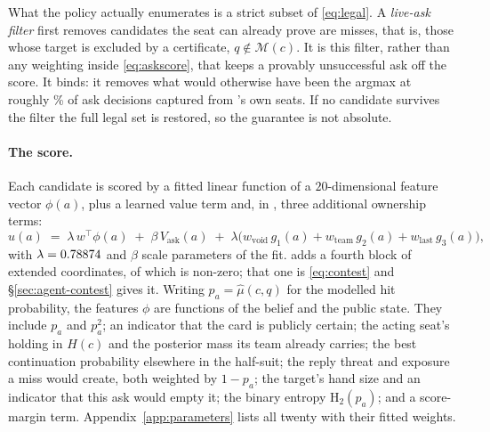 What the policy actually enumerates is a strict subset of \eqref{eq:legal}. A \emph{live-ask filter} first removes candidates the seat can already prove are misses, that is,
those whose target is excluded by a certificate, $q \notin \mathcal{M}(c)$. It is this filter, rather
than any weighting inside \eqref{eq:askscore}, that keeps a provably unsuccessful ask off the score. It
binds: it removes what would otherwise have been the argmax at roughly \vsevenGateBindRate\% of
\vsevenGateBindN{} ask decisions captured from \sestina{}'s own seats. If no candidate survives the filter the full legal set is
restored, so the guarantee is not absolute.

\paragraph{The score.} Each candidate is scored by a fitted linear function of a
$20$-dimensional feature vector $\phi(a)$, plus a learned value term and, in \sestina{}, three
additional ownership terms:
\begin{equation}
  u(a) \;=\; \lambda\, w^{\!\top}\phi(a) \;+\; \beta\, V_{\mathrm{ask}}(a)
  \;+\; \lambda\bigl(w_{\mathrm{void}}\, g_1(a) + w_{\mathrm{team}}\, g_2(a)
  + w_{\mathrm{last}}\, g_3(a)\bigr),
  \label{eq:askscore}
\end{equation}
with $\lambda = 0.78874{}$ and $\beta$ scale parameters of the fit. \sestina{} adds a
fourth block of \vsevenResponderTotal{} extended coordinates, of which
\vsevenResponderNonzero{} is non-zero; that one is \eqref{eq:contest} and
\S\ref{sec:agent-contest} gives it. Writing $p_a = \hat\mu(c,q)$ for the modelled
hit probability, the features $\phi$ are functions of the belief and the public state. They include $p_a$ and $p_a^2$; an indicator that the card is publicly
certain; the acting seat's holding in $H(c)$ and the posterior mass its team already carries; the
best continuation probability elsewhere in the half-suit; the
reply threat and exposure a miss would create, both weighted by $1-p_a$; the target's hand size and
an indicator that this ask would empty it; the binary entropy $\mathrm{H}_2(p_a)$; and a score-margin
term. Appendix~\ref{app:parameters} lists all twenty with their fitted weights.

